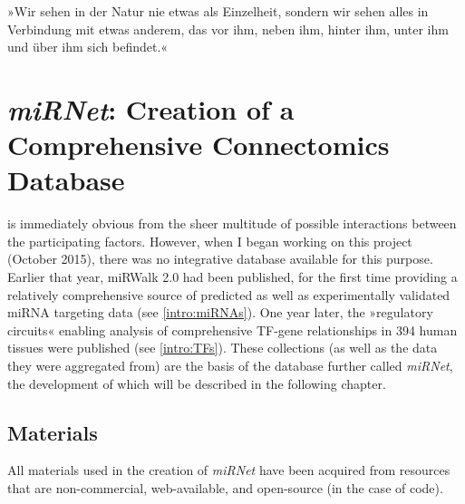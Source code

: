 \begin{savequote}[75mm]
»Wir sehen in der Natur nie etwas als Einzelheit, sondern wir sehen alles in Verbindung mit etwas anderem, das vor ihm, neben ihm, hinter ihm, unter ihm und über ihm sich befindet.«
\end{savequote}

\chapter[miRNet: Creation of a Comprehensive Connectomics Database]{\textit{miRNet}: Creation of a\\Comprehensive Connectomics Database}
 is immediately obvious from the sheer multitude of possible interactions between the participating factors. However, when I began working on this project (October 2015), there was no integrative database available for this purpose. Earlier that year, miRWalk 2.0 had been published, for the first time providing a relatively comprehensive source of predicted as well as experimentally validated miRNA targeting data\cite{Dweep2015} (see \ref{intro:miRNAs}). One year later, the »regulatory circuits« enabling analysis of comprehensive TF-gene relationships in 394 human tissues were published\cite{Marbach2016} (see \ref{intro:TFs}). These collections (as well as the data they were aggregated from) are the basis of the database further called \textit{miRNet}, the development of which will be described in the following chapter.

\section{Materials}
All materials used in the creation of \textit{miRNet} have been acquired from resources that are non-commercial, web-available, and open-source (in the case of code).


